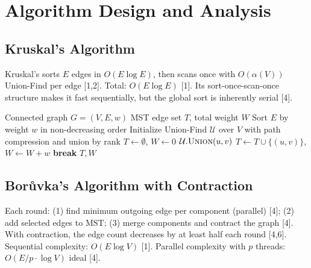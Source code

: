 \documentclass[12pt, a4paper]{article}
\begin{document}
\section{Algorithm Design and Analysis}

\subsection{Kruskal's Algorithm}

Kruskal's sorts $E$ edges in $O(E \log E)$, then scans once with $O(\alpha(V))$ Union-Find per edge [1,2]. Total: $O(E \log E)$ [1]. Its sort-once-scan-once structure makes it fast sequentially, but the global sort is inherently serial [4].

\begin{algorithm}[H]
\caption{Kruskal's MST (Sequential) [2]}
\begin{algorithmic}[1]
\Require Connected graph $G = (V, E, w)$
\Ensure MST edge set $T$, total weight $W$
\State Sort $E$ by weight $w$ in non-decreasing order
\State Initialize Union-Find $\mathcal{U}$ over $V$ with path compression and union by rank
\State $T \gets \emptyset$,\; $W \gets 0$
        \State $\mathcal{U}.\textsc{Union}(u, v)$
        \State $T \gets T \cup \{(u,v)\}$,\; $W \gets W + w$
    \EndIf
     \textbf{break} \EndIf
\EndFor
\State \Return $T, W$
\end{algorithmic}
\end{algorithm}

\subsection{Bor\r{u}vka's Algorithm with Contraction}

Each round: (1) find minimum outgoing edge per component (parallel) [4]; (2) add selected edges to MST; (3) merge components and contract the graph [4]. With contraction, the edge count decreases by at least half each round [4,6]. Sequential complexity: $O(E \log V)$ [1]. Parallel complexity with $p$ threads: $O(E/p \cdot \log V)$ ideal [4].
\end{document}
